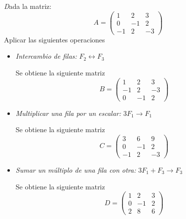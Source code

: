 \documentclass[compacto,10pt]{pubciencias-notas}
\begin{document}
\begin{ejem}\hspace{0pt}\label{Ejem:OprEle} \emph Dada la matriz:
     \[
           A=\begin{pmatrix}
           1&2&3 \\
           0&-1&2\\
           -1&2&-3
           \end{pmatrix}
        \]
    Aplicar las siguientes operaciones
    \begin{itemize}
        \item \textit{Intercambio de filas:} $F_2 \leftrightarrow F_3$

        Se obtiene la siguiente matriz
        \[
           B=\begin{pmatrix}
           1&2&3 \\
           -1&2&-3\\
           0&-1&2
           \end{pmatrix}
        \]

        \item \textit{Multiplicar una fila por un escalar:} $3  F_1 \rightarrow F_1$

        Se obtiene la siguiente matriz
        \[
           C=\begin{pmatrix}
           3&6&9 \\
           0&-1&2\\
           -1&2&-3
           \end{pmatrix}
        \]

        \item \textit{Sumar un múltiplo de una fila con otra:} $3 F_1 + F_3\rightarrow F_3$

        Se obtiene la siguiente matriz
        \[
           D=\begin{pmatrix}
           1&2&3 \\
           0&-1&2\\
           2&8&6
           \end{pmatrix}
        \]
    \end{itemize}
    \end{ejem}
    
    
\end{document}
